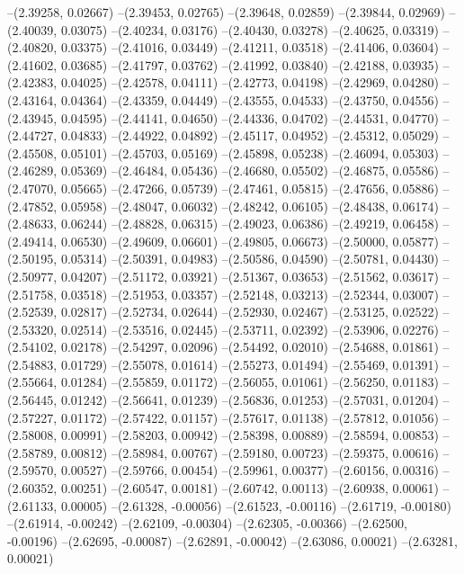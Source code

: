 --(2.39258, 0.02667)
--(2.39453, 0.02765)
--(2.39648, 0.02859)
--(2.39844, 0.02969)
--(2.40039, 0.03075)
--(2.40234, 0.03176)
--(2.40430, 0.03278)
--(2.40625, 0.03319)
--(2.40820, 0.03375)
--(2.41016, 0.03449)
--(2.41211, 0.03518)
--(2.41406, 0.03604)
--(2.41602, 0.03685)
--(2.41797, 0.03762)
--(2.41992, 0.03840)
--(2.42188, 0.03935)
--(2.42383, 0.04025)
--(2.42578, 0.04111)
--(2.42773, 0.04198)
--(2.42969, 0.04280)
--(2.43164, 0.04364)
--(2.43359, 0.04449)
--(2.43555, 0.04533)
--(2.43750, 0.04556)
--(2.43945, 0.04595)
--(2.44141, 0.04650)
--(2.44336, 0.04702)
--(2.44531, 0.04770)
--(2.44727, 0.04833)
--(2.44922, 0.04892)
--(2.45117, 0.04952)
--(2.45312, 0.05029)
--(2.45508, 0.05101)
--(2.45703, 0.05169)
--(2.45898, 0.05238)
--(2.46094, 0.05303)
--(2.46289, 0.05369)
--(2.46484, 0.05436)
--(2.46680, 0.05502)
--(2.46875, 0.05586)
--(2.47070, 0.05665)
--(2.47266, 0.05739)
--(2.47461, 0.05815)
--(2.47656, 0.05886)
--(2.47852, 0.05958)
--(2.48047, 0.06032)
--(2.48242, 0.06105)
--(2.48438, 0.06174)
--(2.48633, 0.06244)
--(2.48828, 0.06315)
--(2.49023, 0.06386)
--(2.49219, 0.06458)
--(2.49414, 0.06530)
--(2.49609, 0.06601)
--(2.49805, 0.06673)
--(2.50000, 0.05877)
--(2.50195, 0.05314)
--(2.50391, 0.04983)
--(2.50586, 0.04590)
--(2.50781, 0.04430)
--(2.50977, 0.04207)
--(2.51172, 0.03921)
--(2.51367, 0.03653)
--(2.51562, 0.03617)
--(2.51758, 0.03518)
--(2.51953, 0.03357)
--(2.52148, 0.03213)
--(2.52344, 0.03007)
--(2.52539, 0.02817)
--(2.52734, 0.02644)
--(2.52930, 0.02467)
--(2.53125, 0.02522)
--(2.53320, 0.02514)
--(2.53516, 0.02445)
--(2.53711, 0.02392)
--(2.53906, 0.02276)
--(2.54102, 0.02178)
--(2.54297, 0.02096)
--(2.54492, 0.02010)
--(2.54688, 0.01861)
--(2.54883, 0.01729)
--(2.55078, 0.01614)
--(2.55273, 0.01494)
--(2.55469, 0.01391)
--(2.55664, 0.01284)
--(2.55859, 0.01172)
--(2.56055, 0.01061)
--(2.56250, 0.01183)
--(2.56445, 0.01242)
--(2.56641, 0.01239)
--(2.56836, 0.01253)
--(2.57031, 0.01204)
--(2.57227, 0.01172)
--(2.57422, 0.01157)
--(2.57617, 0.01138)
--(2.57812, 0.01056)
--(2.58008, 0.00991)
--(2.58203, 0.00942)
--(2.58398, 0.00889)
--(2.58594, 0.00853)
--(2.58789, 0.00812)
--(2.58984, 0.00767)
--(2.59180, 0.00723)
--(2.59375, 0.00616)
--(2.59570, 0.00527)
--(2.59766, 0.00454)
--(2.59961, 0.00377)
--(2.60156, 0.00316)
--(2.60352, 0.00251)
--(2.60547, 0.00181)
--(2.60742, 0.00113)
--(2.60938, 0.00061)
--(2.61133, 0.00005)
--(2.61328, -0.00056)
--(2.61523, -0.00116)
--(2.61719, -0.00180)
--(2.61914, -0.00242)
--(2.62109, -0.00304)
--(2.62305, -0.00366)
--(2.62500, -0.00196)
--(2.62695, -0.00087)
--(2.62891, -0.00042)
--(2.63086, 0.00021)
--(2.63281, 0.00021)
